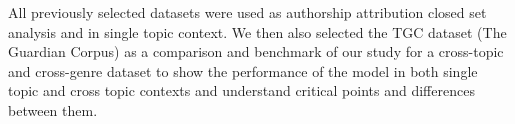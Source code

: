All previously selected datasets were used as authorship attribution closed set analysis and in single topic context.
We then also selected the TGC dataset (The Guardian Corpus) as a comparison and benchmark of our study for a cross-topic and cross-genre dataset to show the performance of the model in both single topic and cross topic contexts and understand critical points and differences between them.